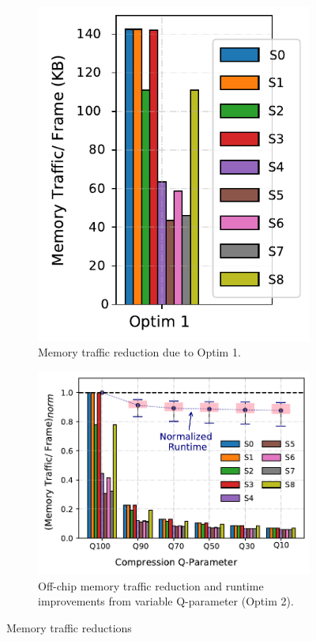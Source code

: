 \begin{figure}[ht]
\centering
\begin{subfigure}{0.39\textwidth}
\centering
\includegraphics[width=\textwidth]{figs/memory_CPU_ALL_GPU.pdf}
		\captionsetup{width=\linewidth}
		\caption{{Memory traffic reduction due to Optim 1.}}
		\label{fig:memory_optim1}
\end{subfigure}
\begin{subfigure}{0.59\textwidth}
\centering
	\includegraphics[width=\textwidth]{figs/robustness3_1.pdf}
		\captionsetup{width=0.8\textwidth}
		\caption{{Off-chip memory traffic reduction and runtime improvements from variable Q-parameter (Optim 2).}}
		\label{fig:optim2_1}
\end{subfigure}
\caption{Memory traffic reductions}
\label{fig:combined}
\vspace{-2em}
\end{figure}

